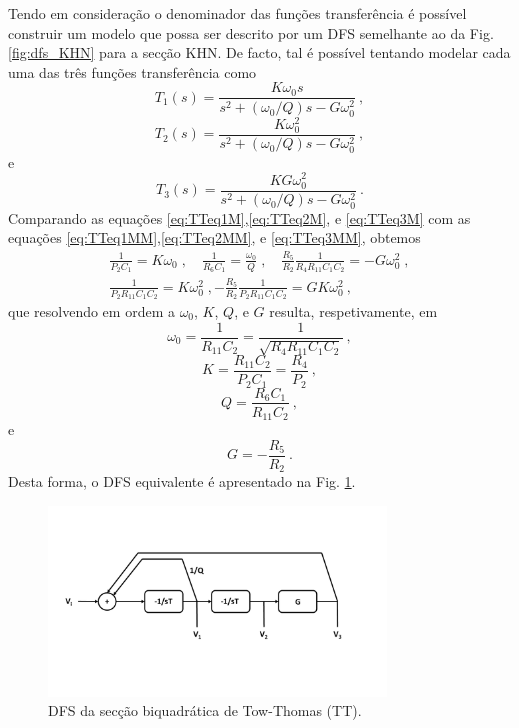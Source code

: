 Tendo em consideração o denominador das funções transferência é possível construir um modelo que possa ser descrito por um DFS semelhante ao da Fig. \ref{fig:dfs_KHN} para a secção KHN. De facto, tal é possível tentando modelar cada uma das três funções transferência como 
\begin{equation}\label{eq:TTeq1MM}
    T_1(s) = \frac{K\omega_0s}{s^2+(\omega_0/Q)s-G\omega_0^2}\:, 
\end{equation}
\begin{equation}\label{eq:TTeq2MM}
    T_2(s) = \frac{K\omega_0^2}{s^2+(\omega_0/Q)s-G\omega_0^2} \:,
\end{equation}
e
\begin{equation}\label{eq:TTeq3MM}
    T_3(s) = \frac{KG\omega_0^2}{s^2+(\omega_0/Q)s-G\omega_0^2}\:.
\end{equation}
Comparando as equações \eqref{eq:TTeq1M},\eqref{eq:TTeq2M}, e \eqref{eq:TTeq3M} com as equações \eqref{eq:TTeq1MM},\eqref{eq:TTeq2MM}, e \eqref{eq:TTeq3MM}, obtemos 
\begin{align}
    \frac{1}{P_2C_1} = K\omega_0\;, \quad \frac{1}{R_6C_1} = \frac{\omega_0}{Q}\;, \quad \frac{R_5}{R_2}\frac{1}{R_{4}R_{11}C_1C_2} = - G\omega_0^2\;,\\ \frac{1}{P_2R_{11}C_1C_2} = K \omega_0^2\;, -\frac{R_5}{R_2}\frac{1}{P_{2}R_{11}C_1C_2} = GK\omega_0^2\:,
\end{align}
que resolvendo em ordem a $\omega_0$, $K$, $Q$, e $G$ resulta, respetivamente, em 
\begin{equation}\label{eq:w0TT}
    \omega_0 = \frac{1}{R_{11}C_2} = \frac{1}{\sqrt{R_4R_{11}C_1C_2}}\:,
\end{equation}
\begin{equation}\label{eq:KTT}
    K=\frac{R_{11}C_2}{P_2C_1}=\frac{R_4}{P_{2}}\:,
\end{equation}
\begin{equation}\label{eq:QTT}
    Q=\frac{R_6C_1}{R_{11}C_2}\:,
\end{equation}
e
\begin{equation}\label{eq:GTT}
    G=-\frac{R_5}{R_2}\:.
\end{equation}
Desta forma, o DFS equivalente é apresentado na Fig. \ref{fig:dfs_tow_thomas_montagem}.
\begin{figure}[h!]
    \centering
    \includegraphics[width = 0.8\textwidth]{Imagens/dfs_TT.pdf}
    \caption{DFS da secção biquadrática de Tow-Thomas (TT).}
    \label{fig:dfs_tow_thomas_montagem}
\end{figure}

